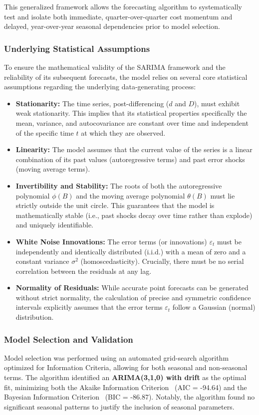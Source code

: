 This generalized framework allows the forecasting algorithm to systematically test and isolate both immediate, quarter-over-quarter cost momentum and delayed, year-over-year seasonal dependencies prior to model selection.
\subsubsection{Underlying Statistical Assumptions}
To ensure the mathematical validity of the SARIMA framework and the reliability of its subsequent forecasts, the model relies on several core statistical assumptions regarding the underlying data-generating process:

\begin{itemize}
    \item \textbf{Stationarity:} The time series, post-differencing ($d$ and $D$), must exhibit weak stationarity. This implies that its statistical properties specifically the mean, variance, and autocovariance are constant over time and independent of the specific time $t$ at which they are observed.
    \item \textbf{Linearity:} The model assumes that the current value of the series is a linear combination of its past values (autoregressive terms) and past error shocks (moving average terms).
    \item \textbf{Invertibility and Stability:} The roots of both the autoregressive polynomial $\phi(B)$ and the moving average polynomial $\theta(B)$ must lie strictly outside the unit circle. This guarantees that the model is mathematically stable (i.e., past shocks decay over time rather than explode) and uniquely identifiable.
    \item \textbf{White Noise Innovations:} The error terms (or innovations) $\varepsilon_t$ must be independently and identically distributed (i.i.d.) with a mean of zero and a constant variance $\sigma^2$ (homoscedasticity). Crucially, there must be no serial correlation between the residuals at any lag.
    \item \textbf{Normality of Residuals:} While accurate point forecasts can be generated without strict normality, the calculation of precise and symmetric confidence intervals explicitly assumes that the error terms $\varepsilon_t$ follow a Gaussian (normal) distribution.
\end{itemize}
\subsubsection{Model Selection and Validation}
Model selection was performed using an automated grid-search algorithm optimized for Information Criteria, allowing for both seasonal and non-seasonal terms. The algorithm identified an \textbf{ARIMA(3,1,0) with drift} as the optimal fit, minimizing both the Akaike Information Criterion~\cite{Akaike1974} (AIC = -94.64) and the Bayesian Information Criterion~\cite{Schwarz1978} (BIC = -86.87). Notably, the algorithm found no significant seasonal patterns to justify the inclusion of seasonal parameters.

